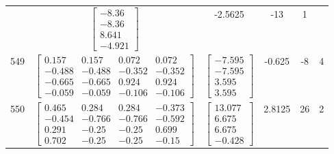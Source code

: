 \documentclass[a4paper,12pt]{article}
\begin{document}
\begin{tabular}{c c c c c c}
&
$\begin{bmatrix} -8.36 \\ -8.36 \\ 8.641 \\ -4.921 \end{bmatrix}$
&
-2.5625
&
-13
&
1
\\
549
&
$\begin{bmatrix} 0.157 & 0.157 & 0.072 & 0.072 \\ -0.488 & -0.488 & -0.352 & -0.352 \\ -0.665 & -0.665 & 0.924 & 0.924 \\ -0.059 & -0.059 & -0.106 & -0.106 \end{bmatrix}$
&
$\begin{bmatrix} -7.595 \\ -7.595 \\ 3.595 \\ 3.595 \end{bmatrix}$
&
-0.625
&
-8
&
4
\\
550
&
$\begin{bmatrix} 0.465 & 0.284 & 0.284 & -0.373 \\ -0.454 & -0.766 & -0.766 & -0.592 \\ 0.291 & -0.25 & -0.25 & 0.699 \\ 0.702 & -0.25 & -0.25 & -0.15 \end{bmatrix}$
&
$\begin{bmatrix} 13.077 \\ 6.675 \\ 6.675 \\ -0.428 \end{bmatrix}$
&
2.8125
&
26
&
2
\\
\end{tabular} \egroup \newpage
\end{document}
